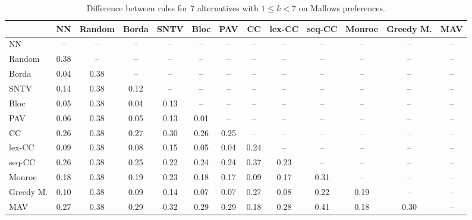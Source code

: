 
\begin{table*}[h!]
\centering
\begin{tabular}{lcccccccccccc}
\toprule
 & NN & Random & Borda & SNTV & Bloc & PAV & CC & lex-CC & seq-CC & Monroe & Greedy M. & MAV \\
\midrule
NN & -- & -- & -- & -- & -- & -- & -- & -- & -- & -- & -- & -- \\
Random & 0.38 & -- & -- & -- & -- & -- & -- & -- & -- & -- & -- & -- \\
Borda & 0.04 & 0.38 & -- & -- & -- & -- & -- & -- & -- & -- & -- & -- \\
SNTV & 0.14 & 0.38 & 0.12 & -- & -- & -- & -- & -- & -- & -- & -- & -- \\
Bloc & 0.05 & 0.38 & 0.04 & 0.13 & -- & -- & -- & -- & -- & -- & -- & -- \\
PAV & 0.06 & 0.38 & 0.05 & 0.13 & 0.01 & -- & -- & -- & -- & -- & -- & -- \\
CC & 0.26 & 0.38 & 0.27 & 0.30 & 0.26 & 0.25 & -- & -- & -- & -- & -- & -- \\
lex-CC & 0.09 & 0.38 & 0.08 & 0.15 & 0.05 & 0.04 & 0.24 & -- & -- & -- & -- & -- \\
seq-CC & 0.26 & 0.38 & 0.25 & 0.22 & 0.24 & 0.24 & 0.37 & 0.23 & -- & -- & -- & -- \\
Monroe & 0.18 & 0.38 & 0.19 & 0.23 & 0.18 & 0.17 & 0.09 & 0.17 & 0.31 & -- & -- & -- \\
Greedy M. & 0.10 & 0.38 & 0.09 & 0.14 & 0.07 & 0.07 & 0.27 & 0.08 & 0.22 & 0.19 & -- & -- \\
MAV & 0.27 & 0.38 & 0.29 & 0.32 & 0.29 & 0.29 & 0.18 & 0.28 & 0.41 & 0.18 & 0.30 & -- \\
\bottomrule
\end{tabular}

\caption{Difference between rules for 7 alternatives with $1 \leq k < 7$ on Mallows preferences.}
\end{table*}
